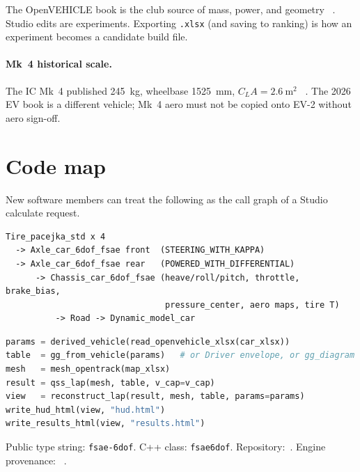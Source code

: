 \documentclass[11pt,letterpaper]{article}
\begin{document}
The OpenVEHICLE book is the club source of mass, power, and geometry
~\cite{jones-linkedin,openlap}. Studio edits are experiments. Exporting
\texttt{.xlsx} (and saving to ranking) is how an experiment becomes a
candidate build file.

\paragraph{Mk~4 historical scale.}
The IC Mk~4 published \SI{245}{\kilo\gram}, wheelbase
\SI{1525}{\milli\metre}, $C_L A=\SI{2.6}{\metre\squared}$
~\cite{okmotorsports}. The 2026 EV book is a different vehicle; Mk~4
aero must not be copied onto EV-2 without aero sign-off.

\section{Code map}
\label{sec:code}

New software members can treat the following as the call graph of a
Studio calculate request.

\begin{lstlisting}[caption={Plant assembly (\texttt{fsae6dof.h}).}]
Tire_pacejka_std x 4
  -> Axle_car_6dof_fsae front  (STEERING_WITH_KAPPA)
  -> Axle_car_6dof_fsae rear   (POWERED_WITH_DIFFERENTIAL)
      -> Chassis_car_6dof_fsae (heave/roll/pitch, throttle, brake_bias,
                                pressure_center, aero maps, tire T)
          -> Road -> Dynamic_model_car
\end{lstlisting}

\begin{lstlisting}[language=Python,caption={Studio calculate (simplified).}]
params = derived_vehicle(read_openvehicle_xlsx(car_xlsx))
table  = gg_from_vehicle(params)   # or Driver envelope, or gg_diagram
mesh   = mesh_opentrack(map_xlsx)
result = qss_lap(mesh, table, v_cap=v_cap)
view   = reconstruct_lap(result, mesh, table, params=params)
write_hud_html(view, "hud.html")
write_results_html(view, "results.html")
\end{lstlisting}

Public type string: \texttt{fsae-6dof}. C++ class: \texttt{fsae6dof}.
Repository:~\cite{vehicle-model-v2}. Engine provenance:
~\cite{manzanero-fastestlap}.

\end{document}
